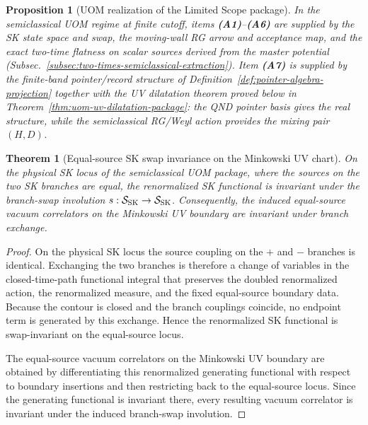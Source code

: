 \documentclass[10pt]{article}
\theoremstyle{definition}
\theoremstyle{plain}
\newtheorem{theorem}{Theorem}[section]
\newtheorem{proposition}{Proposition}[section]
\begin{document}
\begin{proposition}[UOM realization of the Limited Scope package]
\label{prop:uom-limited-scope-realization}
In the semiclassical UOM regime at finite cutoff, items \textbf{(A1)}--\textbf{(A6)} are supplied by the SK
state space and swap, the moving-wall RG arrow and acceptance map, and the exact two-time flatness on scalar
sources derived from the master potential (Subsec.~\ref{subsec:two-times-semiclassical-extraction}).
Item \textbf{(A7)} is supplied by the finite-band pointer/record structure of
Definition~\ref{def:pointer-algebra-projection} together with the UV dilatation theorem
proved below in Theorem~\ref{thm:uom-uv-dilatation-package}: the QND pointer basis gives the
real structure, while the semiclassical RG/Weyl action provides the mixing pair $(H,D)$.
\end{proposition}

\begin{theorem}[Equal-source SK swap invariance on the Minkowski UV chart]
\label{thm:uom-equal-source-swap}
On the physical SK locus of the semiclassical UOM package, where the sources on
the two SK branches are equal, the renormalized SK functional is invariant
under the branch-swap involution \(s:\mathcal S_{\rm SK}\to\mathcal S_{\rm SK}\).
Consequently, the induced equal-source vacuum correlators on the Minkowski UV
boundary are invariant under branch exchange.
\end{theorem}

\begin{proof}
On the physical SK locus the source coupling on the \(+\) and \(-\) branches is
identical. Exchanging the two branches is therefore a change of variables in the
closed-time-path functional integral that preserves the doubled renormalized
action, the renormalized measure, and the fixed equal-source boundary data.
Because the contour is closed and the branch couplings coincide, no endpoint term
is generated by this exchange. Hence the renormalized SK functional is
swap-invariant on the equal-source locus.

The equal-source vacuum correlators on the Minkowski UV boundary are obtained by
differentiating this renormalized generating functional with respect to boundary
insertions and then restricting back to the equal-source locus. Since the
generating functional is invariant there, every resulting vacuum correlator is
invariant under the induced branch-swap involution.
\end{proof}
\end{document}
